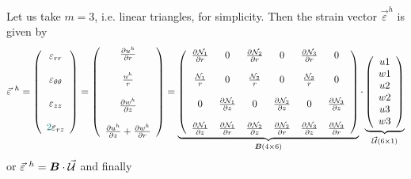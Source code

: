 \noindent Let us take $m=3$, i.e. linear triangles, for simplicity. Then 
the strain vector $\vec{\varepsilon}^h$ is given by
\[
\vec\varepsilon^{~h}=
\left(
\begin{array}{c}
\varepsilon_{rr} \\ \\
\varepsilon_{\theta\theta} \\ \\
\varepsilon_{zz} \\ \\
{\color{teal}2}\varepsilon_{rz}
\end{array}
\right)
=
\left(
\begin{array}{c}
\frac{\partial u^h}{\partial r} \\ \\
\frac{u^h}{r} \\ \\
\frac{\partial w^h}{\partial z} \\ \\
\frac{\partial u^h}{\partial z} + \frac{\partial w^h}{\partial r} 
\end{array}
\right)
=
\underbrace{
\left(
\begin{array}{ccccccccc}
\frac{\partial {\mathcal{N}}_1}{\partial r} &  0 &  
\frac{\partial {\mathcal{N}}_2}{\partial r} &  0 &
\frac{\partial {\mathcal{N}}_3}{\partial r} &  0 \\  \\
\frac{{\mathcal{N}}_1}{r}  & 0 &  
\frac{{\mathcal{N}}_2}{r}  & 0 &
\frac{{\mathcal{N}}_3}{r}  & 0 \\  \\
 0 & \frac{\partial {\mathcal{N}}_1}{\partial z}  &
 0 & \frac{\partial {\mathcal{N}}_2}{\partial z}  &
 0 & \frac{\partial {\mathcal{N}}_3}{\partial z}  \\ \\
\frac{\partial {\mathcal{N}}_1}{\partial z} & \frac{\partial {\mathcal{N}}_1}{\partial r}  &
\frac{\partial {\mathcal{N}}_2}{\partial z} & \frac{\partial {\mathcal{N}}_2}{\partial r}  &
\frac{\partial {\mathcal{N}}_3}{\partial z} & \frac{\partial {\mathcal{N}}_3}{\partial r}   
\end{array}
\right)
}_{\bm B (4\times 6) }
\cdot
\underbrace{
\left(
\begin{array}{c}
u1 \\  w1 \\ u2 \\  w2 \\ u3 \\ w3 
\end{array}
\right)
}_{\vec {\cal U} (6\times1)}
\]
or $\vec{\varepsilon}^{~h}= {\bm B} \cdot \vec{\cal U}$
and finally 

